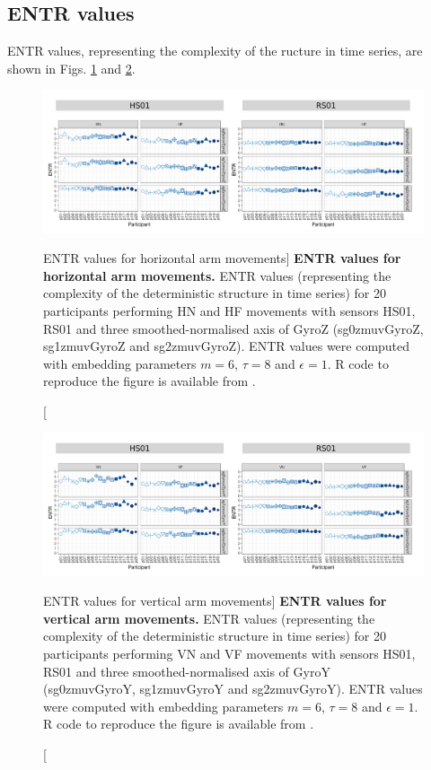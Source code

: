 \newpage
\subsection{ENTR values}
ENTR values, representing the complexity of the ructure in time series,
are shown in Figs. \ref{fig:entr_aH} and \ref{fig:entr_aV}.

\begin{figure}
\centering
\includegraphics[width=1.0\textwidth]{entr_aH}
    \caption
	[ENTR values for horizontal arm movements]{
	{\bf ENTR values for horizontal arm movements.}
    	ENTR values (representing the complexity of the deterministic 
	structure in time series) for 
	20 participants performing HN and HF movements
	with sensors HS01, RS01 and three smoothed-normalised axis 
	of GyroZ (sg0zmuvGyroZ, sg1zmuvGyroZ and sg2zmuvGyroZ).
	ENTR values were computed with 
	embedding parameters $m=6$, $\tau=8$ and $\epsilon=1$.
	R code to reproduce the figure is available from \cite{xochicale2018}.
        }
    \label{fig:entr_aH}
\end{figure}
\begin{figure}
\centering
\includegraphics[width=1.0\textwidth]{entr_aV}
    \caption
	[ENTR values for vertical arm movements]{
	{\bf ENTR values for vertical arm movements.}
    	ENTR values (representing the complexity of the deterministic 
	structure in time series) for 
	20 participants performing VN and VF movements
	with sensors HS01, RS01 and three smoothed-normalised axis 
	of GyroY (sg0zmuvGyroY, sg1zmuvGyroY and sg2zmuvGyroY).
	ENTR values were computed with 
	embedding parameters $m=6$, $\tau=8$ and $\epsilon=1$.
	R code to reproduce the figure is available from \cite{xochicale2018}.
        }
    \label{fig:entr_aV}
\end{figure}





